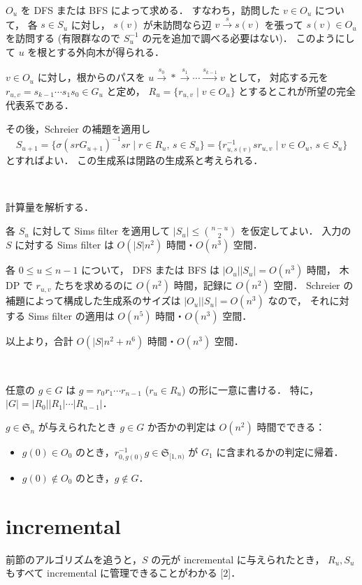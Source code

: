 \documentclass{jsarticle}
\newcommand{\abs}[1]{\lvert #1 \rvert}
\renewcommand{\S}{\mathfrak{S}}
\begin{document}
$O_u$ を DFS または BFS によって求める．
すなわち，訪問した $v \in O_u$ について，
各 $s \in S_u$ に対し，
$s(v)$ が未訪問なら辺 $v \overset{s}{\to} s(v)$ を張って $s(v) \in O_u$ を訪問する
(有限群なので $S_u^{-1}$ の元を追加で調べる必要はない)．
このようにして $u$ を根とする外向木が得られる．

$v \in O_u$ に対し，根からのパスを
$u \overset{s_0}{\to} * \overset{s_1}{\to} \cdots \overset{s_{k-1}}{\to} v$ として，
対応する元を $r_{u,v} = s_{k-1} \cdots s_1 s_0 \in G_u$ と定め，
$R_u = \{ r_{u,v} \mid v \in O_u \}$ とするとこれが所望の完全代表系である．

その後，Schreier の補題を適用し
\[
  S_{u+1}
  = \{ \sigma(sr G_{u+1})^{-1} sr \mid r \in R_u,\, s \in S_u \}
  = \{ r_{u,s(v)}^{-1} s r_{u,v} \mid v \in O_u,\, s \in S_u \}
\]
とすればよい．
この生成系は閉路の生成系と考えられる．

\

計算量を解析する．

各 $S_u$ に対して Sims filter を適用して $\abs{S_u} \le \binom{n-u}{2}$ を仮定してよい．
入力の $S$ に対する Sims filter は $O(\abs{S} n^2)$ 時間・$O(n^3)$ 空間．

各 $0 \le u \le n-1$ について，
DFS または BFS は $\abs{O_u} \abs{S_u} = O(n^3)$ 時間，
木 DP で $r_{u,v}$ たちを求めるのに $O(n^2)$ 時間，記録に $O(n^2)$ 空間．
Schreier の補題によって構成した生成系のサイズは $\abs{O_u} \abs{S_u} = O(n^3)$ なので，
それに対する Sims filter の適用は $O(n^5)$ 時間・$O(n^3)$ 空間．

以上より，合計 $O(\abs{S} n^2 + n^6)$ 時間・$O(n^3)$ 空間．

\

任意の $g \in G$ は $g = r_0 r_1 \cdots r_{n-1}$ ($r_u \in R_u$) の形に一意に書ける．
特に，$\abs{G} = \abs{R_0} \abs{R_1} \cdots \abs{R_{n-1}}$．

$g \in \S_n$ が与えられたとき $g \in G$ か否かの判定は $O(n^2)$ 時間でできる：
\begin{itemize}
  \item $g(0) \in O_0$ のとき，$r_{0,g(0)}^{-1} g \in \S_{[1,n)}$ が $G_1$ に含まれるかの判定に帰着．
  \item $g(0) \not\in O_0$ のとき，$g \not\in G$．
\end{itemize}


\section{incremental}
前節のアルゴリズムを追うと，$S$ の元が incremental に与えられたとき，
$R_u, S_u$ もすべて incremental に管理できることがわかる [2]．
\end{document}
